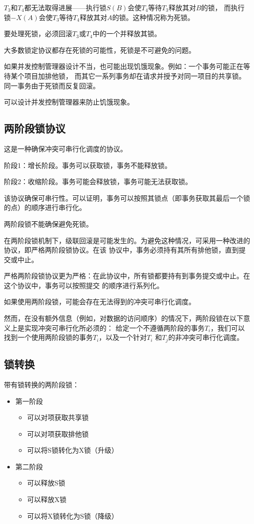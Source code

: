 $T_3$和$T_4$都无法取得进展——执行锁$S(B)$会使$T_4$等待$T_3$释放其对$B$的锁，
而执行锁$-X(A)$会使$T_3$等待$T_4$释放其对$A$的锁。这种情况称为死锁。

要处理死锁，必须回滚$T_3$或$T_4$中的一个并释放其锁。

大多数锁定协议都存在死锁的可能性，死锁是不可避免的问题。

如果并发控制管理器设计不当，也可能出现饥饿现象。例如：一个事务可能正在等待某个项目加排他锁，
而其它一系列事务却在请求并授予对同一项目的共享锁。同一事务由于死锁而反复回滚。

可以设计并发控制管理器来防止饥饿现象。

\subsection{两阶段锁协议}

这是一种确保冲突可串行化调度的协议。

阶段1：增长阶段。事务可以获取锁，事务不能释放锁。

阶段2：收缩阶段。事务可能会释放锁，事务可能无法获取锁。

该协议确保可串行性。可以证明，事务可以按照其锁点（即事务获取其最后一个锁的点）的顺序进行串行化。

两阶段锁不能确保避免死锁。

在两阶段锁机制下，级联回滚是可能发生的。为避免这种情况，可采用一种改进的协议，即严格两阶段锁协议。在该
协议中，事务必须持有其所有排他锁，直到提交或中止。

严格两阶段锁协议更为严格：在此协议中，所有锁都要持有到事务提交或中止。在这个协议中，事务可以按照提交
的顺序进行系列化。

如果使用两阶段锁，可能会存在无法得到的冲突可串行化调度。

然而，在没有额外信息（例如，对数据的访问顺序）的情况下，两阶段锁在以下意义上是实现冲突可串行化所必须的：
给定一个不遵循两阶段的事务$T_i$，我们可以找到一个使用两阶段锁的事务$T_i$，以及一个针对$T_i$
和$T_j$的非冲突可串行化调度。

\subsection{锁转换}

带有锁转换的两阶段锁：
\begin{itemize}
    \item 第一阶段
       \begin{itemize}
          \item 可以对项获取共享锁
          \item 可以对项获取排他锁
          \item 可以将S锁转化为X锁（升级）
       \end{itemize}
    \item 第二阶段
       \begin{itemize}
          \item 可以释放S锁
          \item 可以释放X锁
          \item 可以将X锁转化为S锁（降级）
       \end{itemize}
\end{itemize}

